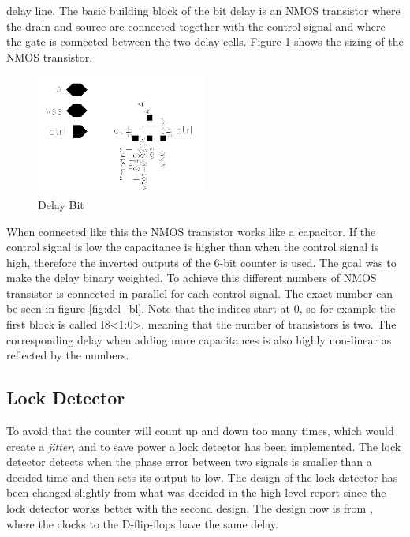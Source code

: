 \documentclass[a4paper,12pt]{article} \usepackage{graphicx}
\begin{document}
delay line. 
The basic building block of the
bit delay is an NMOS transistor where the drain and source are connected
together with the control signal and where the gate is connected between the two
delay cells. Figure \ref{fig:del_bit} shows the sizing of the NMOS transistor.
\begin{figure}[h]
        \centering
        \includegraphics[width=0.5\textwidth]{../Bilder/Delay_Line/Delay_bit.png}
        \caption{Delay Bit}
        \label{fig:del_bit}
\end{figure}
When connected like this the NMOS transistor works like a capacitor. If the control
signal is low the capacitance is higher than when the control signal is high,
therefore the inverted outputs of the 6-bit counter is used. The goal was to
make the delay binary weighted. To achieve this different numbers of NMOS
transistor is connected in parallel for each control signal. The exact number
can be seen in figure \ref{fig:del_bl}. Note that the indices start at 0, so for
example the first block is called I8<1:0>, meaning that the number of
transistors is two. The corresponding delay when adding more capacitances is
also highly non-linear as reflected by the numbers.

\clearpage

\subsection{Lock Detector}
\label{sec:lck_det}
To avoid that the counter will count up and down too many times, which would
create a \emph{jitter}, and to save power a lock detector has been implemented. The
lock detector detects when the phase error between two signals is
smaller than a decided time and then sets its output to low. The
design of the lock detector has been changed slightly from what was
decided in the high-level report since the lock detector works better
with the second design. The design now is from \cite{dll_report},
where the clocks to the D-flip-flops have the same delay. 
\end{document}
